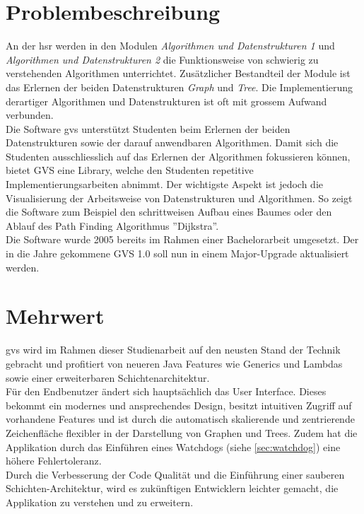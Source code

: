 \documentclass[11pt,a4paper,english,oneside]{book}
\numberwithin{equation}{chapter}
\begin{document}
	\section{Problembeschreibung}
	An der \gls{hsr} werden in den Modulen \textit{Algorithmen und Datenstrukturen 1} und \textit{Algorithmen und Datenstrukturen 2} die Funktionsweise von schwierig zu verstehenden Algorithmen unterrichtet. Zusätzlicher Bestandteil der Module ist das Erlernen der beiden Datenstrukturen \textit{Graph} und \textit{Tree}. Die Implementierung derartiger Algorithmen und Datenstrukturen ist oft mit grossem Aufwand verbunden. \\
	Die Software \gls{gvs} unterstützt Studenten beim Erlernen der beiden Datenstrukturen sowie der darauf anwendbaren Algorithmen. Damit sich die Studenten ausschliesslich auf das Erlernen der Algorithmen fokussieren können, bietet GVS eine Library, welche den Studenten repetitive Implementierungsarbeiten abnimmt. Der wichtigste Aspekt ist jedoch die Visualisierung der Arbeitsweise von Datenstrukturen und Algorithmen. So zeigt die Software zum Beispiel den schrittweisen Aufbau eines Baumes oder den Ablauf des Path Finding Algorithmus ''Dijkstra''. \\
	Die Software wurde 2005 bereits im Rahmen einer Bachelorarbeit umgesetzt. Der in die Jahre gekommene GVS 1.0 soll nun in einem Major-Upgrade aktualisiert werden.
	
	
	
	\section{Mehrwert}
	\gls{gvs} wird im Rahmen dieser Studienarbeit auf den neusten Stand der Technik gebracht und profitiert von neueren Java Features wie Generics und Lambdas sowie einer erweiterbaren Schichtenarchitektur. \\
	
	\noindent
	Für den Endbenutzer ändert sich hauptsächlich das User Interface. Dieses bekommt ein modernes und ansprechendes Design, besitzt intuitiven Zugriff auf vorhandene Features und ist durch die automatisch skalierende und zentrierende Zeichenfläche flexibler in der Darstellung von Graphen und Trees. Zudem hat die Applikation durch das Einführen eines Watchdogs (siehe \ref{sec:watchdog}) eine höhere Fehlertoleranz. \\
	
	\noindent
	Durch die Verbesserung der Code Qualität und die Einführung einer sauberen Schichten-Architektur, wird es zukünftigen Entwicklern leichter gemacht, die Applikation zu verstehen und zu erweitern.	
	
\end{document}
